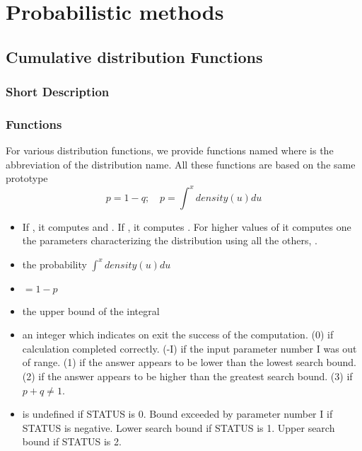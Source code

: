 \section{Probabilistic methods}
\subsection{Cumulative distribution Functions}
\subsubsection{Short Description}
\subsubsection*{Functions}



For various distribution functions, we provide functions named
 where  is the abbreviation of the distribution
name. All these functions are based on the same prototype
\begin{equation*}
  p = 1-q; \quad p = \int^x density(u) du 
\end{equation*}

\begin{itemize}
\item {} If , it computes  and . If
  , it computes . For higher values of  it
  computes one the parameters characterizing the distribution using all the
  others, .
\item {} the probability $\int^x density(u) du $
\item {} $= 1 - p$
\item {} the upper bound of the integral
\item {} an integer which indicates on exit the success of the
  computation. (0) if calculation completed correctly. (-I) if the input
  parameter number I was out of range. (1) if the answer appears to be lower
  than the lowest search bound.  (2) if the answer appears to be higher than
  the greatest search bound.  (3) if $p + q \ne 1$.
\item {} is undefined if STATUS is 0.  Bound exceeded by parameter
  number I if STATUS is negative. Lower search bound if STATUS is 1.  Upper
  search bound if STATUS is 2.
\end{itemize}

